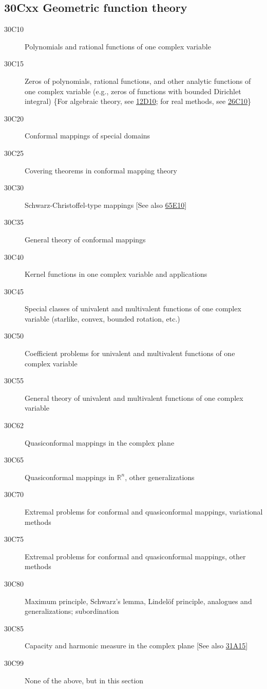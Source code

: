 \documentclass[letterpaper]{article}
\begin{document}
\subsection*{30Cxx  Geometric function theory }\label{30Cxx}
\begin{description}  
\item [30C10]\label{30C10} Polynomials and rational functions of one complex variable
\item [30C15]\label{30C15} Zeros of polynomials, rational functions, and other analytic functions of one complex variable (e.g., zeros of functions with bounded Dirichlet integral) \{For algebraic theory, see \hyperref[12D10]{12D10}; for real methods, see \hyperref[26C10]{26C10}\}
\item [30C20]\label{30C20} Conformal mappings of special domains 
\item [30C25]\label{30C25} Covering theorems in conformal mapping theory
\item [30C30]\label{30C30} Schwarz-Christoffel-type mappings [See also \hyperref[65E10]{65E10}]
\item [30C35]\label{30C35} General theory of conformal mappings
\item [30C40]\label{30C40} Kernel functions in one complex variable and applications 
\item [30C45]\label{30C45} Special classes of univalent and multivalent functions of one complex variable (starlike, convex, bounded rotation, etc.)
\item [30C50]\label{30C50} Coefficient problems for univalent and multivalent functions of one complex variable
\item [30C55]\label{30C55} General theory of univalent and multivalent functions of one complex variable
\item [30C62]\label{30C62} Quasiconformal mappings in the complex plane
\item [30C65]\label{30C65} Quasiconformal mappings in $\mathbb{R}^n$, other generalizations
\item [30C70]\label{30C70} Extremal problems for conformal and  quasiconformal mappings, variational methods
\item [30C75]\label{30C75} Extremal problems for conformal and quasiconformal mappings, other methods
\item [30C80]\label{30C80} Maximum principle, Schwarz's lemma, Lindel\"{o}f principle, analogues and generalizations; subordination
\item [30C85]\label{30C85} Capacity and harmonic measure in the complex plane [See also \hyperref[31A15]{31A15}]
\item [30C99]\label{30C99} None of the above, but in this section
\end{description}
\end{document}
